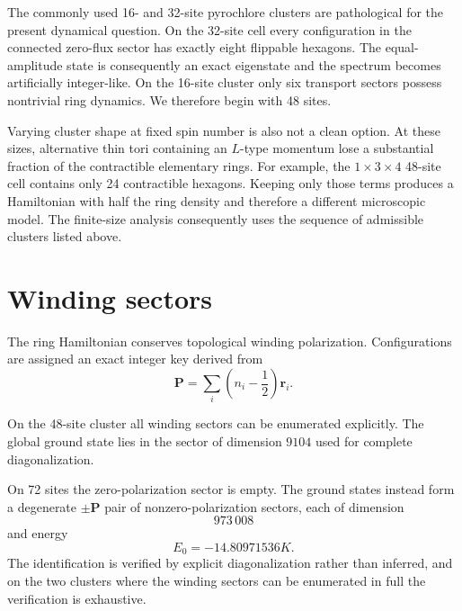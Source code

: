 \documentclass[
aps,
prl,
onecolumn,
amsmath,
amssymb,
superscriptaddress,
longbibliography
]{revtex4-2}
\begin{document}
The commonly used 16- and 32-site pyrochlore clusters are
pathological for the present dynamical question.
On the 32-site cell every configuration in the connected zero-flux
sector has exactly eight flippable hexagons.
The equal-amplitude state is consequently an exact eigenstate and the
spectrum becomes artificially integer-like.
On the 16-site cluster only six transport sectors possess nontrivial
ring dynamics.
We therefore begin with 48 sites.

Varying cluster shape at fixed spin number is also not a clean option.
At these sizes, alternative thin tori containing an $L$-type momentum
lose a substantial fraction of the contractible elementary rings.
For example, the $1\times3\times4$ 48-site cell contains only 24
contractible hexagons.
Keeping only those terms produces a Hamiltonian with half the ring
density and therefore a different microscopic model.
The finite-size analysis consequently uses the sequence of admissible
clusters listed above.

\section{Winding sectors}
\label{sec:winding}

The ring Hamiltonian conserves topological winding polarization.
Configurations are assigned an exact integer key derived from
\begin{equation}
\bm P
=
\sum_i
\left(n_i-\frac12\right)\bm r_i .
\end{equation}

On the 48-site cluster all winding sectors can be enumerated
explicitly.
The global ground state lies in the sector of dimension $9104$ used
for complete diagonalization.

On 72 sites the zero-polarization sector is empty.
The ground states instead form a degenerate $\pm\bm P$ pair of
nonzero-polarization sectors, each of dimension
\begin{equation}
973\,008
\end{equation}
and energy
\begin{equation}
E_0=-14.80971536K .
\end{equation}
The identification is verified by explicit diagonalization rather than
inferred, and on the two clusters where the winding sectors can be
enumerated in full the verification is exhaustive.
\end{document}
